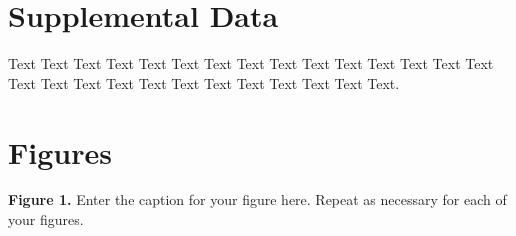 \documentclass{frontiersMED} %
\begin{document}
\section*{Supplemental Data}
Text Text Text Text Text Text  Text Text Text Text Text Text Text Text Text  Text Text Text Text Text Text Text Text Text  Text Text Text.



\section*{Figures}




 \textbf{Figure 1.}{ Enter the caption for your figure here.  Repeat as  necessary for each of your figures.}\label{fig:01}%


\end{document}
